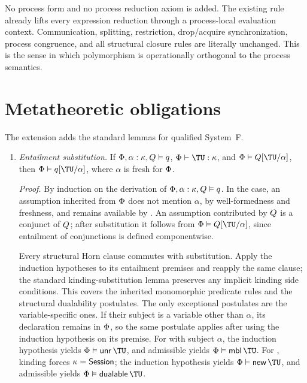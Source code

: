 No process form and no process reduction axiom is added.  The existing
 rule already lifts every expression reduction through a
process-local evaluation context.  Communication, splitting, restriction,
drop/acquire synchronization, process congruence, and all structural closure
rules are literally unchanged.  This is the sense in which polymorphism is
operationally orthogonal to the process semantics.

\section{Metatheoretic obligations}

The extension adds the standard lemmas for qualified System~F.

\begin{enumerate}
\item \emph{Entailment substitution.}  If
  $\Phi,\alpha:\kappa,Q\mathrel{\vDash}q$,
  $\TyCtx\vdash\TU:\Kind$, and
  $\TyCtx\Entails\Qual{[\TU/\alpha]}$, then
  $\TyCtx\Entails\Prop{[\TU/\alpha]}$, where $\alpha$ is fresh for
  $\Phi$.

  \emph{Proof.}
  By induction on the derivation of
  $\Phi,\alpha:\kappa,Q\mathrel{\vDash}q$.
  In the  case, an assumption inherited from $\Phi$
  does not mention $\alpha$, by well-formedness and freshness, and remains
  available by .  An assumption contributed by $Q$
  is a conjunct of $Q$; after substitution it follows from
  $\TyCtx\Entails\Qual{[\TU/\alpha]}$, since entailment of conjunctions is
  defined componentwise.

  Every structural Horn clause commutes with substitution.  Apply the
  induction hypotheses to its entailment premises and reapply the same
  clause; the standard kinding-substitution lemma preserves any implicit
  kinding side conditions.  This covers the inherited monomorphic predicate
  rules and the structural dualability postulates.  The only exceptional
  postulates are the variable-specific ones.  If their subject is a variable
  other than $\alpha$, its declaration remains in $\Phi$, so the same
  postulate applies after using the induction hypothesis on its premise.  For
   with subject $\alpha$, the induction hypothesis
  yields $\TyCtx\Entails\Unr\TU$, and admissible
   yields $\TyCtx\Entails\Mobile\TU$.  For
  , kinding forces $\kappa=\mathsf{Session}$; the induction
  hypothesis yields $\TyCtx\Entails\SNew\TU$, and admissible
   yields $\TyCtx\Entails\Dualable\TU$.


\end{enumerate}
